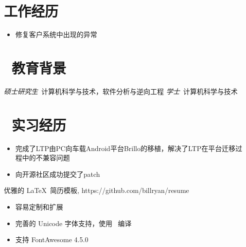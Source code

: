 \documentclass{resume}
\begin{document}

 

\section{工作经历}
\begin{itemize}
	\item 修复客户系统中出现的异常
\end{itemize}

\section{\faGraduationCap\  教育背景}
\textit{硕士研究生}\ 计算机科学与技术，软件分析与逆向工程 
\textit{学士}\ 计算机科学与技术

\section{\faUsers\ 实习经历}

\begin{itemize}
  \item 完成了LTP由PC向车载Android平台Brillo的移植，解决了LTP在平台迁移过程中的不兼容问题
  \item 向开源社区成功提交了patch
\end{itemize}

\begin{onehalfspacing}
优雅的 \LaTeX\ 简历模板, https://github.com/billryan/resume
\begin{itemize}
  \item 容易定制和扩展
  \item 完善的 Unicode 字体支持，使用 \XeLaTeX\ 编译
  \item 支持 FontAwesome 4.5.0
\end{itemize}
\end{onehalfspacing}
\end{document}
